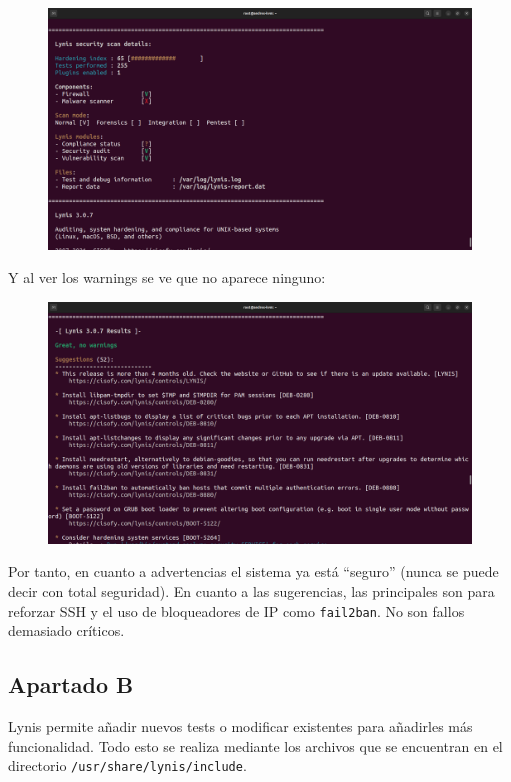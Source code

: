 \documentclass{article}
\begin{document}
\begin{figure}[H]
    \includegraphics[width=\textwidth]{imagenes/lynisresults2.png}
\end{figure}

\newpage

Y al ver los warnings se ve que no aparece ninguno:

\begin{figure}[H]
    \includegraphics[width=\textwidth]{imagenes/lyniswarnings2.png}
\end{figure}

Por tanto, en cuanto a advertencias el sistema ya está ``seguro'' (nunca se puede decir con total seguridad). En cuanto a las sugerencias, las principales son para reforzar SSH y el uso de bloqueadores de IP como \verb|fail2ban|. No son fallos demasiado críticos.

\bigskip

\subsection*{Apartado B}
Lynis permite añadir nuevos tests o modificar existentes para añadirles más funcionalidad. Todo esto se realiza mediante los archivos que se encuentran en el directorio \verb|/usr/share/lynis/include|.
\end{document}
